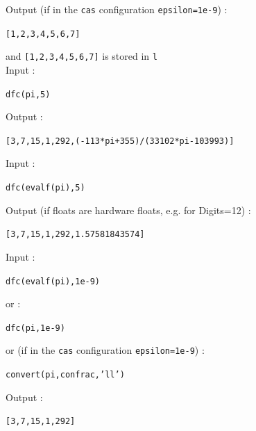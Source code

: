 \documentclass[a4paper,11pt]{book}
\begin{document}
Output (if in the {\tt cas} configuration {\tt epsilon=1e-9}) :
\begin{center}{\tt [1,2,3,4,5,6,7]}\end{center} 
and {\tt [1,2,3,4,5,6,7]} is stored in {\tt l}\\
Input :
\begin{center}{\tt dfc(pi,5)}\end{center}
Output :
\begin{center}{\tt [3,7,15,1,292,(-113*pi+355)/(33102*pi-103993)]}\end{center} 
Input :
\begin{center}{\tt dfc(evalf(pi),5)}\end{center}
Output (if floats are hardware floats, e.g. for Digits=12) :
\begin{center}{\tt [3,7,15,1,292,1.57581843574]}\end{center} 
Input :
\begin{center}{\tt dfc(evalf(pi),1e-9)}\end{center}
or :
\begin{center}{\tt dfc(pi,1e-9)}\end{center}
or (if in the {\tt cas} configuration {\tt epsilon=1e-9}) :
\begin{center}{\tt convert(pi,confrac,'ll')}\end{center}
Output :
\begin{center}{\tt [3,7,15,1,292]}\end{center} 
\end{document}
